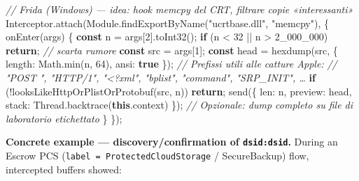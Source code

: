 \documentclass[
  english,
  10pt]{article}
\newenvironment{Shaded}{}{}
\newcommand{\AttributeTok}[1]{\textcolor[rgb]{0.49,0.56,0.16}{#1}}
\newcommand{\BuiltInTok}[1]{\textcolor[rgb]{0.00,0.50,0.00}{#1}}
\newcommand{\CommentTok}[1]{\textcolor[rgb]{0.38,0.63,0.69}{\textit{#1}}}
\newcommand{\ControlFlowTok}[1]{\textcolor[rgb]{0.00,0.44,0.13}{\textbf{#1}}}
\newcommand{\DataTypeTok}[1]{\textcolor[rgb]{0.56,0.13,0.00}{#1}}
\newcommand{\DecValTok}[1]{\textcolor[rgb]{0.25,0.63,0.44}{#1}}
\newcommand{\FunctionTok}[1]{\textcolor[rgb]{0.02,0.16,0.49}{#1}}
\newcommand{\KeywordTok}[1]{\textcolor[rgb]{0.00,0.44,0.13}{\textbf{#1}}}
\newcommand{\NormalTok}[1]{#1}
\newcommand{\OperatorTok}[1]{\textcolor[rgb]{0.40,0.40,0.40}{#1}}
\newcommand{\StringTok}[1]{\textcolor[rgb]{0.25,0.44,0.63}{#1}}
\begin{document}
\begin{Shaded}
\begin{Highlighting}[]
\CommentTok{// Frida (Windows) — idea: hook memcpy del CRT, filtrare copie «interessanti»}
\NormalTok{Interceptor}\OperatorTok{.}\FunctionTok{attach}\NormalTok{(Module}\OperatorTok{.}\FunctionTok{findExportByName}\NormalTok{(}\StringTok{"ucrtbase.dll"}\OperatorTok{,} \StringTok{"memcpy"}\NormalTok{)}\OperatorTok{,}\NormalTok{ \{}
  \FunctionTok{onEnter}\NormalTok{(args) \{}
    \KeywordTok{const}\NormalTok{ n }\OperatorTok{=}\NormalTok{ args[}\DecValTok{2}\NormalTok{]}\OperatorTok{.}\FunctionTok{toInt32}\NormalTok{()}\OperatorTok{;}
    \ControlFlowTok{if}\NormalTok{ (n }\OperatorTok{\textless{}} \DecValTok{32} \OperatorTok{||}\NormalTok{ n }\OperatorTok{\textgreater{}} \DecValTok{2\_000\_000}\NormalTok{) }\ControlFlowTok{return}\OperatorTok{;}          \CommentTok{// scarta rumore}
    \KeywordTok{const}\NormalTok{ src }\OperatorTok{=}\NormalTok{ args[}\DecValTok{1}\NormalTok{]}\OperatorTok{;}
    \KeywordTok{const}\NormalTok{ head }\OperatorTok{=} \FunctionTok{hexdump}\NormalTok{(src}\OperatorTok{,}\NormalTok{ \{ }\DataTypeTok{length}\OperatorTok{:} \BuiltInTok{Math}\OperatorTok{.}\FunctionTok{min}\NormalTok{(n}\OperatorTok{,} \DecValTok{64}\NormalTok{)}\OperatorTok{,} \DataTypeTok{ansi}\OperatorTok{:} \KeywordTok{true}\NormalTok{ \})}\OperatorTok{;}
    \CommentTok{// Prefissi utili alle catture Apple:}
    \CommentTok{//  "POST ", "HTTP/1", "\textless{}?xml", "bplist", "command", "SRP\_INIT", …}
    \ControlFlowTok{if}\NormalTok{ (}\OperatorTok{!}\FunctionTok{looksLikeHttpOrPlistOrProtobuf}\NormalTok{(src}\OperatorTok{,}\NormalTok{ n)) }\ControlFlowTok{return}\OperatorTok{;}
    \FunctionTok{send}\NormalTok{(\{ }\DataTypeTok{len}\OperatorTok{:}\NormalTok{ n}\OperatorTok{,} \DataTypeTok{preview}\OperatorTok{:}\NormalTok{ head}\OperatorTok{,} \DataTypeTok{stack}\OperatorTok{:}\NormalTok{ Thread}\OperatorTok{.}\FunctionTok{backtrace}\NormalTok{(}\KeywordTok{this}\OperatorTok{.}\AttributeTok{context}\NormalTok{) \})}\OperatorTok{;}
    \CommentTok{// Opzionale: dump completo su file di laboratorio etichettato}
\NormalTok{  \}}
\NormalTok{\})}\OperatorTok{;}
\end{Highlighting}
\end{Shaded}

\textbf{Concrete example --- discovery/confirmation of
\texttt{dsid:dsid}.} During an Escrow PCS
(\texttt{label\ =\ ProtectedCloudStorage} / SecureBackup) flow,
intercepted buffers showed:
\end{document}
